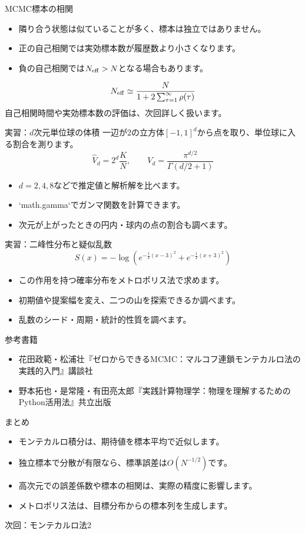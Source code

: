 \documentclass[12pt,aspectratio=43]{beamer}
\begin{document}
\begin{frame}[t]{MCMC標本の相関}
  \begin{itemize}
    \setlength{\itemsep}{2mm}
    \item 隣り合う状態は似ていることが多く、標本は独立ではありません。
    \item 正の自己相関では実効標本数が履歴数より小さくなります。
    \item 負の自己相関では$N_{\rm eff}>N$となる場合もあります。
  \end{itemize}
  \[
    N_{\rm eff}\simeq\frac{N}{1+2\sum_{\tau=1}^{\infty}\rho(\tau)}
  \]
  \small 自己相関時間や実効標本数の評価は、次回詳しく扱います。
\end{frame}

\begin{frame}[t]{実習：$d$次元単位球の体積}
  一辺が2の立方体$[-1,1]^d$から点を取り、単位球に入る割合を測ります。
  \[
    \widehat V_d=2^d\frac{K}{N},\qquad
    V_d=\frac{\pi^{d/2}}{\Gamma(d/2+1)}
  \]
  \begin{itemize}
    \item $d=2,4,8$などで推定値と解析解を比べます。
    \item `math.gamma`でガンマ関数を計算できます。
    \item 次元が上がったときの円内・球内の点の割合も調べます。
  \end{itemize}
\end{frame}

\begin{frame}[t]{実習：二峰性分布と疑似乱数}
  \[
    S(x)=-\log\!\left(e^{-\frac12(x-3)^2}+e^{-\frac12(x+3)^2}\right)
  \]
  \begin{itemize}
    \item この作用を持つ確率分布をメトロポリス法で求めます。
    \item 初期値や提案幅を変え、二つの山を探索できるか調べます。
    \item 乱数のシード・周期・統計的性質を調べます。
  \end{itemize}
\end{frame}

\begin{frame}[t]{参考書籍}
  \begin{itemize}
    \setlength{\itemsep}{5mm}
    \item 花田政範・松浦壮『ゼロからできるMCMC：マルコフ連鎖モンテカルロ法の実践的入門』講談社
    \item 野本拓也・是常隆・有田亮太郎『実践計算物理学：物理を理解するためのPython活用法』共立出版
  \end{itemize}
\end{frame}

\begin{frame}[t]{まとめ}
  \begin{itemize}
    \setlength{\itemsep}{3mm}
    \item モンテカルロ積分は、期待値を標本平均で近似します。
    \item 独立標本で分散が有限なら、標準誤差は$O(N^{-1/2})$です。
    \item 高次元での誤差係数や標本の相関は、実際の精度に影響します。
    \item メトロポリス法は、目標分布からの標本列を生成します。
  \end{itemize}
  \vfill
  次回：モンテカルロ法2
\end{frame}
\end{document}
